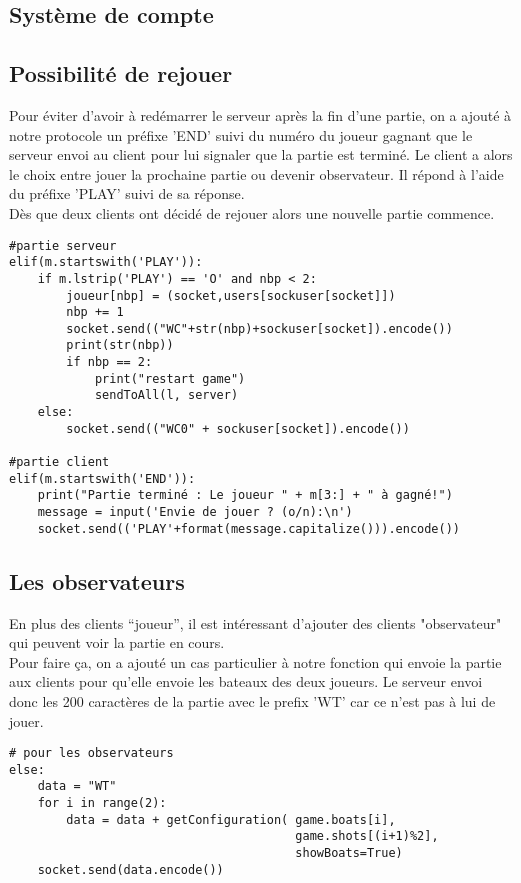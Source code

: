 \documentclass[12pt]{article}
\begin{document}
\subsection{Système de compte}

\subsection{Possibilité de rejouer}
\textnormal{
Pour éviter d'avoir à redémarrer le serveur après la fin d'une partie, on a ajouté à notre protocole un préfixe 'END' suivi du numéro du joueur gagnant que le serveur envoi au client pour lui signaler que la partie est terminé. Le client a alors le choix entre jouer la prochaine partie ou devenir observateur. Il répond à l'aide du préfixe 'PLAY' suivi de sa réponse.\\
Dès que deux clients ont décidé de rejouer alors une nouvelle partie commence.
}
\begin{verbatim}
#partie serveur
elif(m.startswith('PLAY')):
    if m.lstrip('PLAY') == 'O' and nbp < 2:
        joueur[nbp] = (socket,users[sockuser[socket]])
        nbp += 1
        socket.send(("WC"+str(nbp)+sockuser[socket]).encode())
        print(str(nbp))
        if nbp == 2:
            print("restart game")
            sendToAll(l, server)
    else:
        socket.send(("WC0" + sockuser[socket]).encode())

#partie client
elif(m.startswith('END')):
    print("Partie terminé : Le joueur " + m[3:] + " à gagné!")
    message = input('Envie de jouer ? (o/n):\n')
    socket.send(('PLAY'+format(message.capitalize())).encode())
\end{verbatim}

\subsection{Les observateurs}
\textnormal{
En plus des clients ``joueur'', il est intéressant d'ajouter des clients "observateur" qui peuvent voir la partie en cours.\\
Pour faire ça, on a ajouté un cas particulier à notre fonction qui envoie la partie aux clients pour qu'elle envoie les bateaux des deux joueurs. Le serveur envoi donc les 200 caractères de la partie avec le prefix 'WT' car ce n'est pas à lui de jouer.
}
\begin{verbatim}
# pour les observateurs
else:
    data = "WT"
    for i in range(2):
        data = data + getConfiguration( game.boats[i],
                                        game.shots[(i+1)%2],
                                        showBoats=True)
    socket.send(data.encode())
\end{verbatim}
\end{document}
